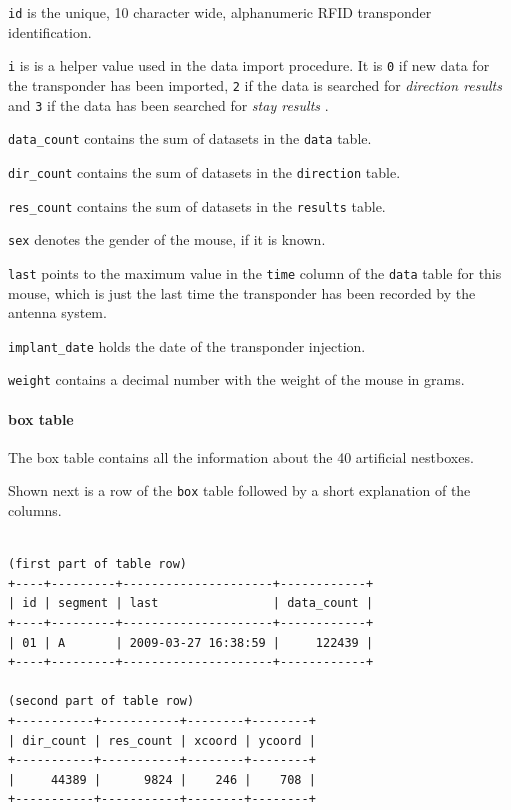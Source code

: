\begin{mydesc}
	\item \lstinline|id| is the unique, 10 character wide, alphanumeric RFID transponder identification.
	\item \lstinline|i| is is a helper value used in the data import procedure. It is \lstinline|0| if new data for the transponder has been imported, \lstinline|2| if the data is searched for \textit{direction results} and \lstinline|3| if the data has been searched for \textit{stay results} .
	\item \lstinline|data_count| contains the sum of datasets in the \lstinline|data| table.
	\item \lstinline|dir_count| contains the sum of datasets in the \lstinline|direction| table.
	\item \lstinline|res_count| contains the sum of datasets in the \lstinline|results| table.
	\item \lstinline|sex| denotes the gender of the mouse, if it is known.
	\item \lstinline|last| points to the maximum value in the \lstinline|time| column of the \lstinline|data| table for this mouse, which is just the last time the transponder has been recorded by the antenna system.
	\item \lstinline|implant_date| holds the date of the transponder injection.
	\item \lstinline|weight| contains a decimal number with the weight of the mouse in grams.
\end{mydesc}

\paragraph{box table}
\label{para:box_table}

The box table contains all the information about the 40 artificial nestboxes. 

Shown next is a row of the \lstinline|box| table followed by a short explanation of the columns.
\codescript
{}
\begin{lstlisting}[frame=none]

(first part of table row)
+----+---------+---------------------+------------+
| id | segment | last                | data_count |
+----+---------+---------------------+------------+
| 01 | A       | 2009-03-27 16:38:59 |     122439 | 
+----+---------+---------------------+------------+

(second part of table row)
+-----------+-----------+--------+--------+
| dir_count | res_count | xcoord | ycoord |
+-----------+-----------+--------+--------+
|     44389 |      9824 |    246 |    708 | 
+-----------+-----------+--------+--------+

\end{lstlisting}

